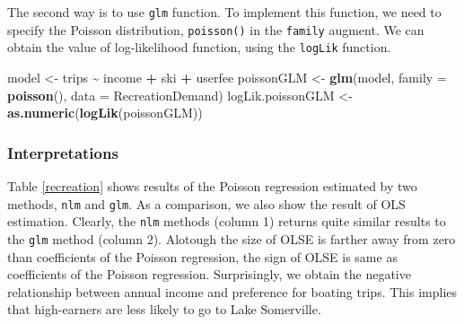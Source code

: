 \documentclass[
  12pt,
]{article}
\newenvironment{Shaded}{\begin{snugshade}}{\end{snugshade}}
\newcommand{\DataTypeTok}[1]{\textcolor[rgb]{0.13,0.29,0.53}{#1}}
\newcommand{\KeywordTok}[1]{\textcolor[rgb]{0.13,0.29,0.53}{\textbf{#1}}}
\newcommand{\NormalTok}[1]{#1}
\newcommand{\OperatorTok}[1]{\textcolor[rgb]{0.81,0.36,0.00}{\textbf{#1}}}
\newcommand{\StringTok}[1]{\textcolor[rgb]{0.31,0.60,0.02}{#1}}
\begin{document}
The second way is to use \texttt{glm} function.
To implement this function, we need to specify the Poisson distribution, \texttt{poisson()} in the \texttt{family} augment.
We can obtain the value of log-likelihood function, using the \texttt{logLik} function.

\begin{Shaded}
\begin{Highlighting}[]
\NormalTok{model \textless{}{-}}\StringTok{ }\NormalTok{trips }\OperatorTok{\textasciitilde{}}\StringTok{ }\NormalTok{income }\OperatorTok{+}\StringTok{ }\NormalTok{ski }\OperatorTok{+}\StringTok{ }\NormalTok{userfee}
\NormalTok{poissonGLM \textless{}{-}}\StringTok{ }\KeywordTok{glm}\NormalTok{(model, }\DataTypeTok{family =} \KeywordTok{poisson}\NormalTok{(), }\DataTypeTok{data =}\NormalTok{ RecreationDemand)}
\NormalTok{logLik.poissonGLM \textless{}{-}}\StringTok{ }\KeywordTok{as.numeric}\NormalTok{(}\KeywordTok{logLik}\NormalTok{(poissonGLM))}
\end{Highlighting}
\end{Shaded}

\hypertarget{interpretations-2}{%
\subsubsection{Interpretations}\label{interpretations-2}}

Table \ref{recreation} shows results of the Poisson regression estimated by two methods, \texttt{nlm} and \texttt{glm}.
As a comparison, we also show the result of OLS estimation.
Clearly, the \texttt{nlm} methods (column 1) returns quite similar results to the \texttt{glm} method (column 2).
Alotough the size of OLSE is farther away from zero than coefficients of the Poisson regression,
the sign of OLSE is same as coefficients of the Poisson regression.
Surprisingly, we obtain the negative relationship between annual income and preference for boating trips.
This implies that high-earners are less likely to go to Lake Somerville.
\end{document}
